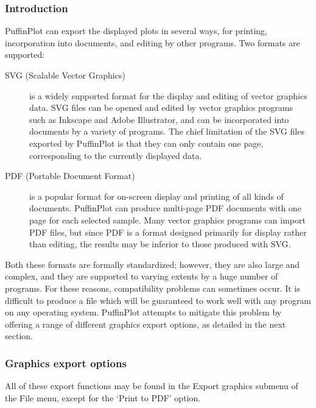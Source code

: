 \documentclass[a4paper,british]{article}
\newcommand{\ppcmd}[1]{\textsf{#1}} %
\begin{document}
\subsubsection{Introduction}

PuffinPlot can export the displayed plots in several ways, for printing,
incorporation into documents, and editing by other programs. Two formats are
supported:

\begin{description}

\item[SVG (Scalable Vector Graphics)] is a widely supported format for the
  display and editing of vector graphics data. SVG files can be opened and
  edited by vector graphics programs such as Inkscape and Adobe Illustrator,
  and can be incorporated into documents by a variety of programs. The chief
  limitation of the SVG files exported by PuffinPlot is that they can
  only contain one page, corresponding to the currently displayed data.

\item[PDF (Portable Document Format)] is a popular format for on-screen
  display and printing of all kinds of documents. PuffinPlot can produce
  multi-page PDF documents with one page for each selected sample.
  Many vector graphics programs can import PDF files, but since PDF is 
  a format designed primarily for display rather than editing, the results
  may be inferior to those produced with SVG.

\end{description}

Both these formats are formally standardized; however, they are also large
and complex, and they are supported to varying extents by a huge number of
programs. For these reasons, compatibility problems can sometimes occur. It
is difficult to produce a file which will be guaranteed to work well with any
program on any operating system. PuffinPlot attempts to mitigate this problem
by offering a range of different graphics export options, as detailed in the
next section.

\subsubsection{Graphics export options}

All of these export functions may be found in the \ppcmd{Export graphics}
submenu of the \ppcmd{File} menu, except for the ‘Print to PDF’ option.
\end{document}
